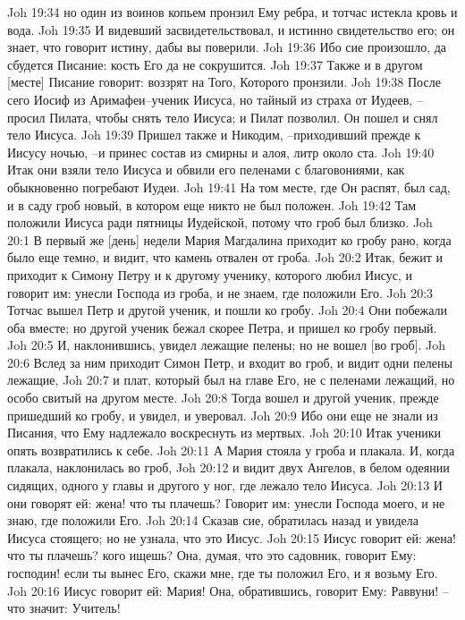 Joh 19:34  но один из воинов копьем пронзил Ему ребра, и тотчас истекла кровь и вода.
Joh 19:35  И видевший засвидетельствовал, и истинно свидетельство его; он знает, что говорит истину, дабы вы поверили.
Joh 19:36  Ибо сие произошло, да сбудется Писание: кость Его да не сокрушится.
Joh 19:37  Также и в другом [месте] Писание говорит: воззрят на Того, Которого пронзили.
Joh 19:38  После сего Иосиф из Аримафеи--ученик Иисуса, но тайный из страха от Иудеев, --просил Пилата, чтобы снять тело Иисуса; и Пилат позволил. Он пошел и снял тело Иисуса.
Joh 19:39  Пришел также и Никодим, --приходивший прежде к Иисусу ночью, --и принес состав из смирны и алоя, литр около ста.
Joh 19:40  Итак они взяли тело Иисуса и обвили его пеленами с благовониями, как обыкновенно погребают Иудеи.
Joh 19:41  На том месте, где Он распят, был сад, и в саду гроб новый, в котором еще никто не был положен.
Joh 19:42  Там положили Иисуса ради пятницы Иудейской, потому что гроб был близко.
Joh 20:1  В первый же [день] недели Мария Магдалина приходит ко гробу рано, когда было еще темно, и видит, что камень отвален от гроба.
Joh 20:2  Итак, бежит и приходит к Симону Петру и к другому ученику, которого любил Иисус, и говорит им: унесли Господа из гроба, и не знаем, где положили Его.
Joh 20:3  Тотчас вышел Петр и другой ученик, и пошли ко гробу.
Joh 20:4  Они побежали оба вместе; но другой ученик бежал скорее Петра, и пришел ко гробу первый.
Joh 20:5  И, наклонившись, увидел лежащие пелены; но не вошел [во гроб].
Joh 20:6  Вслед за ним приходит Симон Петр, и входит во гроб, и видит одни пелены лежащие,
Joh 20:7  и плат, который был на главе Его, не с пеленами лежащий, но особо свитый на другом месте.
Joh 20:8  Тогда вошел и другой ученик, прежде пришедший ко гробу, и увидел, и уверовал.
Joh 20:9  Ибо они еще не знали из Писания, что Ему надлежало воскреснуть из мертвых.
Joh 20:10  Итак ученики опять возвратились к себе.
Joh 20:11  А Мария стояла у гроба и плакала. И, когда плакала, наклонилась во гроб,
Joh 20:12  и видит двух Ангелов, в белом одеянии сидящих, одного у главы и другого у ног, где лежало тело Иисуса.
Joh 20:13  И они говорят ей: жена! что ты плачешь? Говорит им: унесли Господа моего, и не знаю, где положили Его.
Joh 20:14  Сказав сие, обратилась назад и увидела Иисуса стоящего; но не узнала, что это Иисус.
Joh 20:15  Иисус говорит ей: жена! что ты плачешь? кого ищешь? Она, думая, что это садовник, говорит Ему: господин! если ты вынес Его, скажи мне, где ты положил Его, и я возьму Его.
Joh 20:16  Иисус говорит ей: Мария! Она, обратившись, говорит Ему: Раввуни! --что значит: Учитель!
